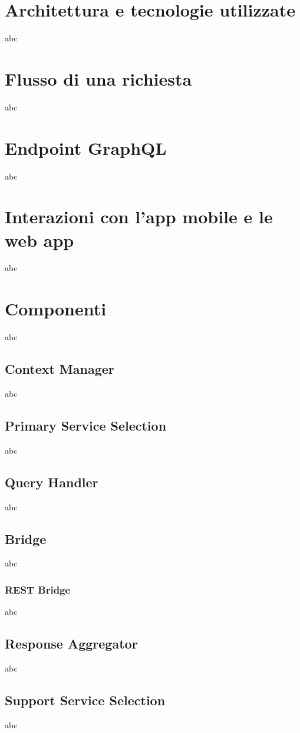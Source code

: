 \section{Architettura e tecnologie utilizzate}

abc

\section{Flusso di una richiesta}

abc

\section{Endpoint GraphQL}

abc

\section{Interazioni con l'app mobile e le web app}

abc

\section{Componenti}

abc

\subsection{Context Manager}

abc

\subsection{Primary Service Selection}

abc

\subsection{Query Handler}

abc

\subsection{Bridge}

abc

\subsubsection{REST Bridge}

abc

\subsection{Response Aggregator}

abc

\subsection{Support Service Selection}

abc